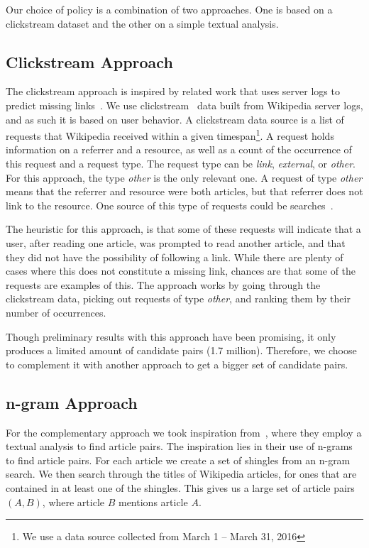 Our choice of policy is a combination of two approaches. One is based on a clickstream dataset and the other on a simple textual analysis.

\subsection{Clickstream Approach}

The clickstream approach is inspired by related work that uses server logs to predict missing links~\cite{hyperlink-structure-using-logs}. We use clickstream~\cite{wiki-clickstream} data built from Wikipedia server logs, and as such it is based on user behavior. A clickstream data source is a list of requests that Wikipedia received within a given timespan\footnote{We use a data source collected from March 1 -- March 31, 2016}. A request holds information on a referrer and a resource, as well as a count of the occurrence of this request and a request type. The request type can be \emph{link}, \emph{external}, or \emph{other}. For this approach, the type \emph{other} is the only relevant one. A request of type \emph{other} means that the referrer and resource were both articles, but that referrer does not link to the resource. One source of this type of requests could be searches~\cite{wiki-clickstream}.

The heuristic for this approach, is that some of these requests will indicate that a user, after reading one article, was prompted to read another article, and that they did not have the possibility of following a link. While there are plenty of cases where this does not constitute a missing link, chances are that some of the requests are examples of this. The approach works by going through the clickstream data, picking out requests of type \emph{other}, and ranking them by their number of occurrences.

Though preliminary results with this approach have been promising, it only produces a limited amount of candidate pairs (1.7 million). Therefore, we choose to complement it with another approach to get a bigger set of candidate pairs.

\subsection{n-gram Approach}

For the complementary approach we took inspiration from~\cite{milne2008learning}, where they employ a textual analysis to find article pairs. The inspiration lies in their use of n-grams to find article pairs. For each article we create a set of shingles from an n-gram search. We then search through the titles of Wikipedia articles, for ones that are contained in at least one of the shingles. This gives us a large set of article pairs $(A,B)$, where article $B$ mentions article $A$.

